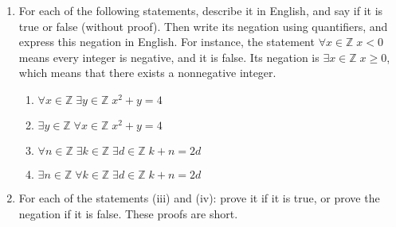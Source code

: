 \documentclass{article}
\newcommand{\Z}{\mathbb{Z}}
\theoremstyle{definition}
\begin{document}
\begin{question}
\begin{enumerate}
	\item For each of the following statements, describe it in English, and say if it is true or false (without proof). Then write its negation using quantifiers, and express this negation in English. For instance, the statement $\forall x \in \Z \; x < 0$ means every integer is negative, and it is false. Its negation is $\exists x \in \Z \; x \geq 0$, which means that there exists a nonnegative integer.
	
	\begin{enumerate}
		\item $\forall x \in \Z \; \exists y \in \Z \; x^2 + y = 4$
		\item $\exists y \in \Z \; \forall x \in \Z \; x^2 + y = 4$
		\item $\forall n \in \Z \; \exists k \in \Z \; \exists d \in \Z \; k+ n = 2d$
		\item $\exists n \in \Z \; \forall k \in \Z \; \exists d \in \Z \; k+ n = 2d$
	\end{enumerate}
	
	\item For each of the statements (iii) and (iv): prove it if it is true, or prove the negation if it is false. These proofs are short.
\end{enumerate}
\end{question}
\end{document}
